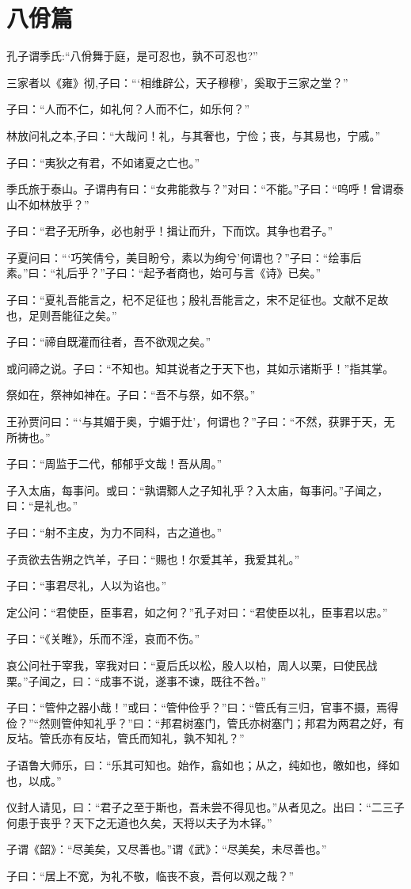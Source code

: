 \documentclass[12pt,a4paper]{ctexbook}
\begin{document}
\section{八佾篇}
孔子谓季氏:“八佾舞于庭，是可忍也，孰不可忍也?”\par
三家者以《雍》彻,子曰：“‘相维辟公，天子穆穆’，奚取于三家之堂？”\par
子曰：“人而不仁，如礼何？人而不仁，如乐何？”\par
林放问礼之本,子曰：“大哉问！礼，与其奢也，宁俭；丧，与其易也，宁戚。”\par
子曰：“夷狄之有君，不如诸夏之亡也。”\par
季氏旅于泰山。子谓冉有曰：“女弗能救与？”对曰：“不能。”子曰：“呜呼！曾谓泰山不如林放乎？”\par
子曰：“君子无所争，必也射乎！揖让而升，下而饮。其争也君子。”\par
子夏问曰：“‘巧笑倩兮，美目盼兮，素以为绚兮’何谓也？”子曰：“绘事后素。”曰：“礼后乎？”子曰：“起予者商也，始可与言《诗》已矣。”\par
子曰：“夏礼吾能言之，杞不足征也；殷礼吾能言之，宋不足征也。文献不足故也，足则吾能征之矣。”\par
子曰：“禘自既灌而往者，吾不欲观之矣。”\par
或问禘之说。子曰：“不知也。知其说者之于天下也，其如示诸斯乎！”指其掌。\par
祭如在，祭神如神在。子曰：“吾不与祭，如不祭。”\par
王孙贾问曰：“‘与其媚于奥，宁媚于灶’，何谓也？”子曰：“不然，获罪于天，无所祷也。”\par
子曰：“周监于二代，郁郁乎文哉！吾从周。”\par
子入太庙，每事问。或曰：“孰谓鄹人之子知礼乎？入太庙，每事问。”子闻之，曰：“是礼也。”\par
子曰：“射不主皮，为力不同科，古之道也。”\par
子贡欲去告朔之饩羊，子曰：“赐也！尔爱其羊，我爱其礼。”\par
子曰：“事君尽礼，人以为谄也。”\par
定公问：“君使臣，臣事君，如之何？”孔子对曰：“君使臣以礼，臣事君以忠。”\par
子曰：“《关睢》，乐而不淫，哀而不伤。”\par
哀公问社于宰我，宰我对曰：“夏后氏以松，殷人以柏，周人以栗，曰使民战栗。”子闻之，曰：“成事不说，遂事不谏，既往不咎。”\par
子曰：“管仲之器小哉！”或曰：“管仲俭乎？”曰：“管氏有三归，官事不摄，焉得俭？”“然则管仲知礼乎？”曰：“邦君树塞门，管氏亦树塞门；邦君为两君之好，有反坫。管氏亦有反坫，管氏而知礼，孰不知礼？”\par
子语鲁大师乐，曰：“乐其可知也。始作，翕如也；从之，纯如也，皦如也，绎如也，以成。”\par
仪封人请见，曰：“君子之至于斯也，吾未尝不得见也。”从者见之。出曰：“二三子何患于丧乎？天下之无道也久矣，天将以夫子为木铎。”\par
子谓《韶》：“尽美矣，又尽善也。”谓《武》：“尽美矣，未尽善也。”\par
子曰：“居上不宽，为礼不敬，临丧不哀，吾何以观之哉？”\par
\end{document}

